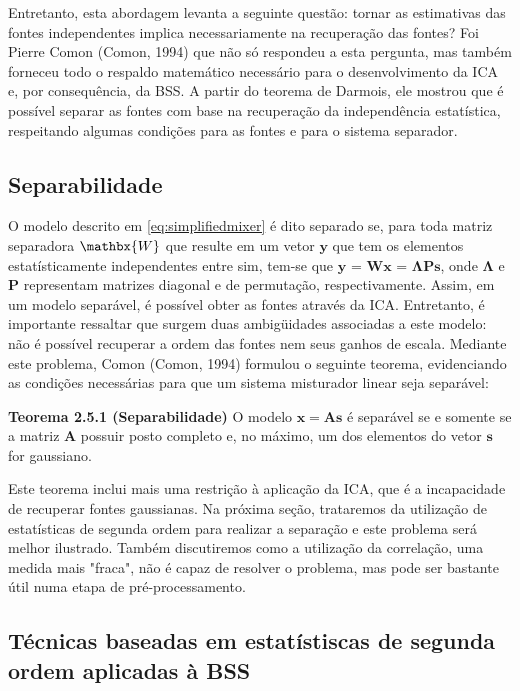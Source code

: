     Entretanto, esta abordagem levanta a seguinte questão: tornar as estimativas das fontes independentes implica necessariamente na recuperação das fontes? Foi Pierre Comon (Comon, 1994) que não só respondeu a esta pergunta, mas também forneceu todo o respaldo matemático necessário para o desenvolvimento da ICA e, por consequência, da BSS.
    A partir do teorema de Darmois, ele mostrou que é possível separar as fontes com base na recuperação da independência estatística, respeitando algumas condições para as fontes e para o sistema separador.

\subsection{Separabilidade}\label{sec:separability}

    O modelo descrito em \ref{eq:simplifiedmixer} é dito separado se, para toda matriz separadora $\mathbx{W}$ que resulte em um vetor $\mathbf{y}$ que tem os elementos estatísticamente independentes entre sim, tem-se que $\mathbf{y}$ = $\mathbf{Wx}$ = $\mathbf{\Lambda P s}$, onde $\mathbf{\Lambda}$ e $\mathbf{P}$ representam matrizes diagonal e de permutação, respectivamente. Assim, em um modelo separável, é possível obter as fontes através da ICA. Entretanto, é importante ressaltar que surgem duas ambigüidades associadas a este modelo: não é possível recuperar a ordem das fontes nem seus ganhos de escala. Mediante este problema, Comon \nocite{Common} (Comon, 1994) formulou o seguinte teorema, evidenciando as condições necessárias para que um sistema misturador linear seja separável:
    
    \bigskip
    
    \textbf{Teorema 2.5.1 (Separabilidade)} O modelo $\mathbf{x} = \mathbf{As}$ é separável se e somente se a matriz $\mathbf{A}$ possuir posto completo e, no máximo, um dos elementos do vetor $\mathbf{s}$ for gaussiano.
    
    \bigskip
    
    Este teorema inclui mais uma restrição à aplicação da ICA, que é a incapacidade de recuperar fontes gaussianas. Na próxima seção, trataremos da utilização de estatísticas de segunda ordem para realizar a separação e este problema será melhor ilustrado. Também discutiremos como a utilização da correlação, uma medida mais "fraca", não é capaz de resolver o problema, mas pode ser bastante útil numa etapa de pré-processamento.
  
\subsection{Técnicas baseadas em estatístiscas de segunda ordem aplicadas à BSS}\label{secondorder}

